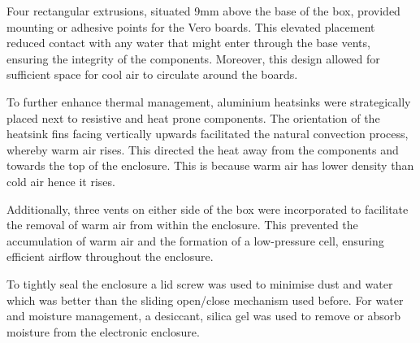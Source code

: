 \documentclass[class=report,11pt,crop=false]{standalone}
\begin{document}
Four rectangular extrusions, situated 9mm above the base of the box, provided mounting or adhesive points for the Vero boards. This elevated placement reduced contact with any water that might enter through the base vents, ensuring the integrity of the components. Moreover, this design allowed for sufficient space for cool air to circulate around the boards.
\newline

To further enhance thermal management, aluminium heatsinks were strategically placed next to resistive and heat prone components. The orientation of the heatsink fins facing vertically upwards facilitated the natural convection process, whereby warm air rises. This directed the heat away from the components and towards the top of the enclosure. This is because warm air has lower density than cold air hence it rises. 
\newline

Additionally, three vents on either side of the box were incorporated to facilitate the removal of warm air from within the enclosure. This prevented the accumulation of warm air and the formation of a low-pressure cell, ensuring efficient airflow throughout the enclosure.
\newline

To tightly seal the enclosure a lid screw was used to minimise dust and water which was better than the sliding open/close mechanism used before.
\newline
For water and moisture management, a desiccant, silica gel was used to remove or absorb moisture from the electronic enclosure.
\newline
\end{document}

